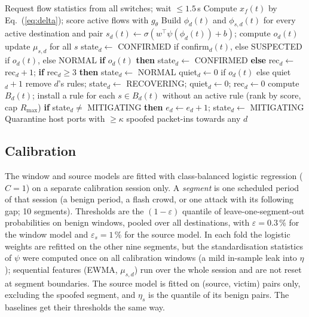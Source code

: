 \documentclass[conference]{IEEEtran}
\begin{document}
\begin{algorithm}[t]
\caption{One polling cycle of the controller}\label{alg:main}
\begin{algorithmic}[1]
\STATE Request flow statistics from all switches; wait $\le1.5$\,s
\STATE Compute $x_f(t)$ by Eq.~(\ref{eq:delta}); score active flows with $g_\theta$
\STATE Build $\phi_d(t)$ and $\phi_{s,d}(t)$ for every active destination and pair
  \STATE $s_d(t)\gets\sigma(w^\top\psi(\phi_d(t))+b)$; compute $o_d(t)$
   \STATE update $\mu_{s,d}$ for all $s$ \ENDIF
     \STATE state$_d\gets$ CONFIRMED if confirm$_d(t)$, else SUSPECTED if $o_d(t)$, else NORMAL
     \STATE \textbf{if} $o_d(t)$ \textbf{then} state$_d\gets$ CONFIRMED \textbf{else} rec$_d\gets$ rec$_d+1$; \textbf{if} rec$_d\ge3$ \textbf{then} state$_d\gets$ NORMAL
     \STATE quiet$_d\gets0$ if $o_d(t)$ else quiet$_d+1$
      \STATE remove $d$'s rules; state$_d\gets$ RECOVERING; quiet$_d\gets0$; rec$_d\gets0$ \ENDIF
  \ENDIF
     \STATE compute $B_d(t)$; install a rule for each $s\in B_d(t)$ without an active rule (rank by score, cap $R_{\max}$)
      \STATE \textbf{if} state$_d\neq$ MITIGATING \textbf{then} $e_d\gets e_d+1$; state$_d\gets$ MITIGATING \ENDIF
  \ENDIF
\ENDFOR
\STATE Quarantine host ports with $\ge\kappa$ spoofed packet-ins towards any $d$
\end{algorithmic}
\end{algorithm}

\subsection{Calibration}
The window and source models are fitted with class-balanced logistic regression ($C=1$) on a separate calibration session only. A \emph{segment} is one scheduled period of that session (a benign period, a flash crowd, or one attack with its following gap; 10 segments). Thresholds are the $(1-\varepsilon)$ quantile of leave-one-segment-out probabilities on benign windows, pooled over all destinations, with $\varepsilon=0.3\,\%$ for the window model and $\varepsilon_s=1\,\%$ for the source model. In each fold the logistic weights are refitted on the other nine segments, but the standardisation statistics of $\psi$ were computed once on all calibration windows (a mild in-sample leak into $\eta$); sequential features (EWMA, $\mu_{s,d}$) run over the whole session and are not reset at segment boundaries. The source model is fitted on (source, victim) pairs only, excluding the spoofed segment, and $\eta_s$ is the quantile of its benign pairs. The baselines get their thresholds the same way.
\end{document}
